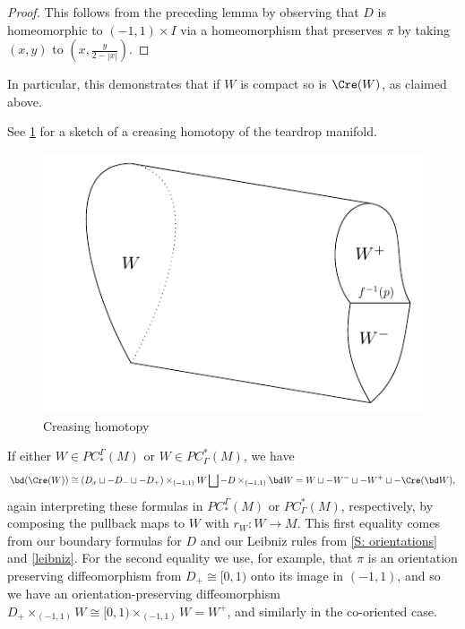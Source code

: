 \begin{proof}
	This follows from the preceding lemma by observing that $D$ is homeomorphic to $(-1,1) \times I$ via a homeomorphism that preserves $\pi$ by taking $(x,y)$ to $\left(x, \frac{y}{2-|x|}\right)$.
\end{proof}

In particular, this demonstrates that if $W$ is compact so is $\Cre(W)$, as claimed above.

See \cref{F: creasing} for a sketch of a creasing homotopy of the teardrop manifold.

\begin{figure}
	\includegraphics{figures/creasing2.pdf}
	\caption{Creasing homotopy}
	\label{F: creasing}
\end{figure}

If either $W \in PC^\Gamma_*(M)$ or $W \in PC_\Gamma^*(M)$, we have
\begin{equation}\label{E: bd crease}
	\bd(\Cre(W))\cong(D_x \sqcup -D_- \sqcup -D_+)\times_{(-1,1)} W \bigsqcup -D\times_{(-1,1)}\bd W = W \sqcup -W^- \sqcup -W^+ \sqcup -\Cre(\bd W),
\end{equation}
again interpreting these formulas in $PC^\Gamma_*(M)$ or $PC_\Gamma^*(M)$, respectively, by composing the pullback maps to $W$ with $r_W \colon W \to M$.
This first equality comes from our boundary formulas for $D$ and our Leibniz rules from \cref{S: orientations} and \cref{leibniz}.
For the second equality we use, for example, that $\pi$ is an orientation preserving diffeomorphism from $D_+ \cong [0,1)$ onto its image in $(-1,1)$, and so we have an orientation-preserving diffeomorphism $D_+\times_{(-1,1)} W \cong [0,1)\times_{(-1,1)} W = W^+$, and similarly in the co-oriented case.


